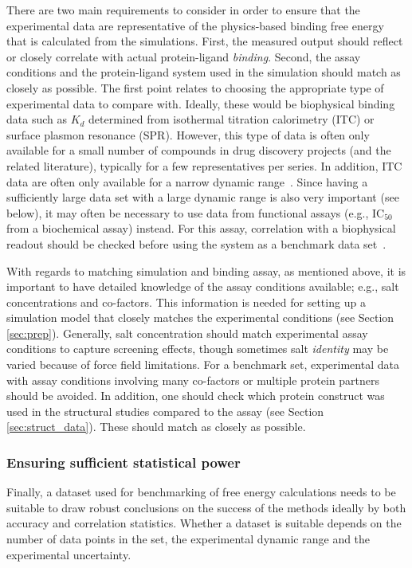 \documentclass[9pt,bestpractices]{livecoms}
\begin{document}
There are two main requirements to consider in order to ensure that the experimental data are representative of the physics-based binding free energy that is calculated from the simulations. First, the measured output should reflect or closely correlate with actual protein-ligand \emph{binding}. Second, the assay conditions and the protein-ligand system used in the simulation should match as closely as possible. The first point relates to choosing the appropriate type of experimental data to compare with. Ideally, these would be biophysical binding data such as $K_d$ determined from isothermal titration calorimetry (ITC) or surface plasmon resonance (SPR). However, this type of data is often only available for a small number of compounds in drug discovery projects (and the related literature), typically for a few representatives per series. In addition, ITC data are often only available for a narrow dynamic range~\cite{wiseman_rapid_1989,chodera_entropyenthalpy_2013}. Since having a sufficiently large data set with a large dynamic range is also very important (see below), it may often be necessary to use data from functional assays (e.g., IC$_{50}$ from a biochemical assay) instead. For this assay, correlation with a biophysical readout should be checked before using the system as a benchmark data set~\cite{kalliokoski_comparability_2013}.

With regards to matching simulation and binding assay, as mentioned above, it is important to have detailed knowledge of the assay conditions available; e.g., salt concentrations and co-factors. This information is needed for setting up a simulation model that closely matches the experimental conditions (see Section \ref{sec:prep}). Generally, salt concentration should match experimental assay conditions to capture screening effects, though sometimes salt \emph{identity} may be varied because of force field limitations. For a benchmark set, experimental data with assay conditions involving many co-factors or multiple protein partners should be avoided. In addition, one should check which protein construct was used in the structural studies compared to the assay (see Section \ref{sec:struct_data}). These should match as closely as possible. 

\subsubsection{Ensuring sufficient statistical power}
Finally, a dataset used for benchmarking of free energy calculations needs to be suitable to draw robust conclusions on the success of the methods ideally by both accuracy and correlation statistics. Whether a dataset is suitable depends on the number of data points in the set, the experimental dynamic range and the experimental uncertainty. 
\end{document}
